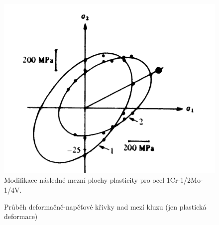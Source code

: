 \begin{figure}[H]
	\centering
	\includegraphics[width=0.7\linewidth]{Obrazky/modifikace-nasledne-mezni-plochy}
	\caption{Modifikace následné mezní plochy plasticity pro ocel 1Cr-1/2Mo-1/4V.}
	\label{fig:modifikace-nasledne-mezni-plochy}
\end{figure}

\begin{figure}[H]
	\centering
	\caption{Průběh deformačně-napěťové křivky nad mezí kluzu (jen plastická deformace)}
	\label{fig:deformacne-napetovka-krivka-chaboche}
\end{figure}
